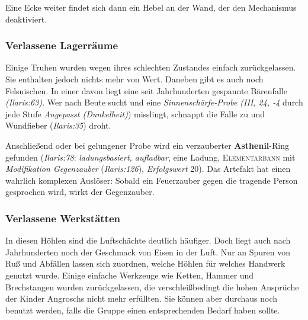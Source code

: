\spaltenende


\spaltenanfang

Eine Ecke weiter findet sich dann ein Hebel an der Wand, der den Mechanismus deaktiviert.


\subsubsection{Verlassene Lagerräume}
Einige Truhen wurden wegen ihres schlechten Zustandes einfach zurückgelassen. 
Sie enthalten jedoch nichts mehr von Wert.
Daneben gibt es auch noch Felsnischen.
In einer davon liegt eine seit Jahrhunderten gespannte Bärenfalle \emph{(Ilaris:63)}.
Wer nach Beute sucht und eine \emph{Sinnenschärfe-Probe (III, 24, -4} durch jede Stufe \emph{Angepasst (Dunkelheit)}) misslingt, schnappt die Falle zu und Wundfieber (\emph{Ilaris:35}) droht.

Anschließend oder bei gelungener Probe wird ein verzauberter \textbf{Asthenil}-Ring gefunden (\emph{Ilaris:78}: \emph{ladungsbasiert, aufladbar}, eine Ladung, \textsc{Elementarbann} mit \emph{Modifikation Gegenzauber} (\emph{Ilaris:126}), \emph{Erfolgswert} 20).
Das Artefakt hat einen wahrlich komplexen Auslöser:
Sobald ein Feuerzauber gegen die tragende Person gesprochen wird, wirkt der Gegenzauber.

\subsubsection{Verlassene Werkstätten}
In diesen Höhlen sind die Luftschächte deutlich häufiger. Doch liegt auch nach Jahrhunderten noch der Geschmack von Eisen in der Luft.
Nur an Spuren von Ruß und Abfällen lassen sich zuordnen, welche Höhlen für welches Handwerk genutzt wurde.
Einige einfache Werkzeuge wie Ketten, Hammer und Brechstangen wurden zurückgelassen, die verschleißbedingt die hohen Ansprüche der Kinder Angroschs nicht mehr erfüllten. Sie können aber durchaus noch benutzt werden, falls die Gruppe einen entsprechenden Bedarf haben sollte.

